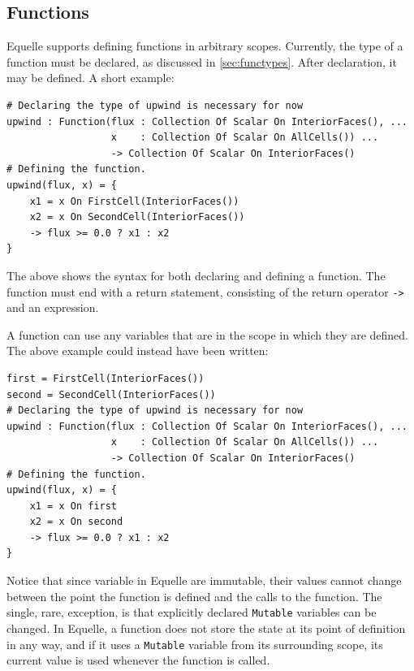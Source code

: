 \documentclass[11pt]{article}
\newcommand{\code}[1]{\texttt{#1}}
\begin{document}
\subsection{Functions}

Equelle supports defining functions in arbitrary scopes. Currently, the type of a function
must be declared, as discussed in \ref{sec:functypes}. After declaration, it may be
defined. A short example:

\begin{verbatim}
# Declaring the type of upwind is necessary for now
upwind : Function(flux : Collection Of Scalar On InteriorFaces(), ...
                  x    : Collection Of Scalar On AllCells()) ...
                  -> Collection Of Scalar On InteriorFaces()
# Defining the function.
upwind(flux, x) = {
    x1 = x On FirstCell(InteriorFaces())
    x2 = x On SecondCell(InteriorFaces())
    -> flux >= 0.0 ? x1 : x2
}
\end{verbatim}

The above shows the syntax for both declaring and defining a function. The function must
end with a return statement, consisting of the return operator \code{->} and an
expression.

A function can use any variables that are in the scope in which they are defined. The
above example could instead have been written:

\begin{verbatim}
first = FirstCell(InteriorFaces())
second = SecondCell(InteriorFaces())
# Declaring the type of upwind is necessary for now
upwind : Function(flux : Collection Of Scalar On InteriorFaces(), ...
                  x    : Collection Of Scalar On AllCells()) ...
                  -> Collection Of Scalar On InteriorFaces()
# Defining the function.
upwind(flux, x) = {
    x1 = x On first
    x2 = x On second
    -> flux >= 0.0 ? x1 : x2
}
\end{verbatim}

Notice that since variable in Equelle are immutable, their values cannot change between
the point the function is defined and the calls to the function. The single, rare, exception,
is that explicitly declared \code{Mutable} variables can be changed. In Equelle, a
function does not store the state at its point of definition in any way, and if it uses a
\code{Mutable} variable from its surrounding scope, its current value is used whenever the
function is called.


\end{document}
